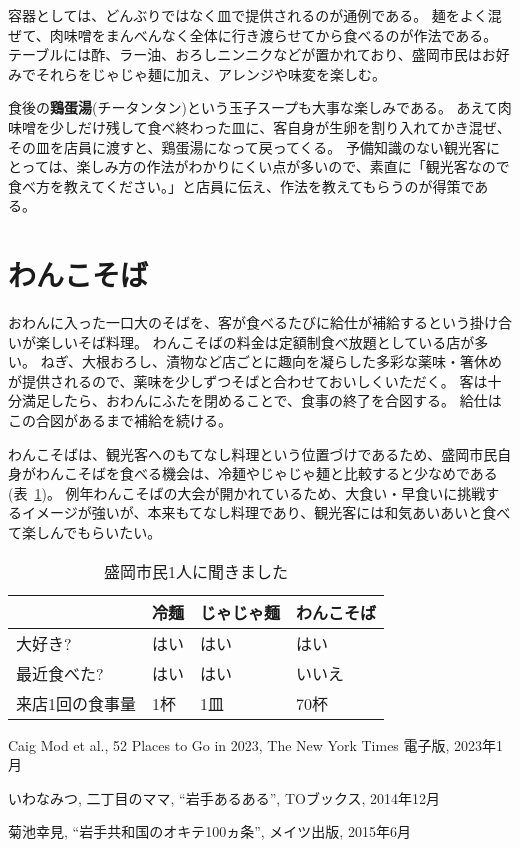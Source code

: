 \documentclass[autodetect-engine,dvi=dvipdfmx,ja=standard,twocolumn,jbase=14.1Q]{bxjsarticle} %
\begin{document}
容器としては、どんぶりではなく皿で提供されるのが通例である。
麺をよく混ぜて、肉味噌をまんべんなく全体に行き渡らせてから食べるのが作法である。
テーブルには酢、ラー油、おろしニンニクなどが置かれており、盛岡市民はお好みでそれらをじゃじゃ麺に加え、アレンジや味変を楽しむ。

食後の\textbf{鶏蛋湯}(チータンタン)という玉子スープも大事な楽しみである。
あえて肉味噌を少しだけ残して食べ終わった皿に、客自身が生卵を割り入れてかき混ぜ、その皿を店員に渡すと、鶏蛋湯になって戻ってくる。
予備知識のない観光客にとっては、楽しみ方の作法がわかりにくい点が多いので、素直に「観光客なので食べ方を教えてください。」と店員に伝え、作法を教えてもらうのが得策である。

\section{わんこそば}
おわんに入った一口大のそばを、客が食べるたびに給仕が補給するという掛け合いが楽しいそば料理。
わんこそばの料金は定額制食べ放題としている店が多い。
ねぎ、大根おろし、漬物など店ごとに趣向を凝らした多彩な薬味・箸休めが提供されるので、薬味を少しずつそばと合わせておいしくいただく。
客は十分満足したら、おわんにふたを閉めることで、食事の終了を合図する。
給仕はこの合図があるまで補給を続ける。

わんこそばは、観光客へのもてなし料理という位置づけであるため、盛岡市民自身がわんこそばを食べる機会は、冷麺やじゃじゃ麺と比較すると少なめである(表~\ref{tbl:interview})。
例年わんこそばの大会が開かれているため、大食い・早食いに挑戦するイメージが強いが、本来もてなし料理であり、観光客には和気あいあいと食べて楽しんでもらいたい。

\begin{table}[htbp]
 \caption{盛岡市民1人に聞きました}
\small
 \centering
 \begin{tabular}{llll} \hline\hline
 & 冷麺 & じゃじゃ麺 & わんこそば \\ \hline
大好き? & はい & はい & はい \\
最近食べた? & はい & はい & いいえ \\
来店1回の食事量 & 1杯 & 1皿 & 70杯 \\ \hline\hline
 \end{tabular}
 \label{tbl:interview}
\end{table}




\begin{thebibliography}{9}%

Caig Mod et al., 52 Places to Go in 2023, The New York Times 電子版, 2023年1月

いわなみつ, 二丁目のママ, ``岩手あるある'', TOブックス, 2014年12月

菊池幸見, ``岩手共和国のオキテ100ヵ条'', メイツ出版, 2015年6月
\end{thebibliography}
\end{document}
